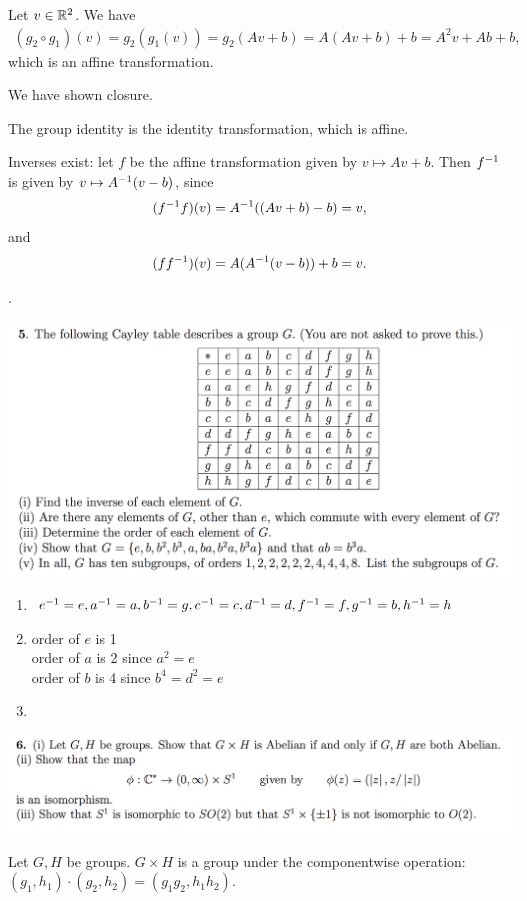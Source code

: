 \documentclass[12pt]{article}
\begin{document}
Let $v \in \mathbb{R}^2$. We have
\begin{align*}
  (g_2 \circ g_1)(v)
  = g_2(g_1(v))
  = g_2(Av + b)
  = A(Av + b) + b
  = A^2v + Ab + b,
\end{align*}
which is an affine transformation.

We have shown closure.

The group identity is the identity transformation, which is affine.

Inverses exist: let $f$ be the affine transformation given by $v \mapsto Av + b$. Then $f^{-1}$ is
given by $v \mapsto A^{-1}(v - b)$, since
\begin{align*}
(f^{-1}f)(v) = A^{-1}((Av + b) - b) = v,
\end{align*}
and
\begin{align*}
(ff^{-1})(v) = A(A^{-1}(v - b)) + b = v.
\end{align*}

.

\newpage
\begin{mdframed}
\includegraphics[width=400pt]{img/oxford-prelims-M1-groups-1-5.png}
\end{mdframed}
\begin{enumerate}[label=(\roman*)]
\item $e^{-1} = e, a^{-1} = a, b^{-1} = g, c^{-1} = c, d^{-1} = d, f^{-1} = f, g^{-1} = b, h^{-1} = h$
\item
  order of $e$ is 1\\
  order of $a$ is 2 since $a^2 = e$\\
  order of $b$ is 4 since $b^4 = d^2 = e$
\item
\end{enumerate}
\newpage
\begin{mdframed}
\includegraphics[width=400pt]{img/oxford-prelims-M1-groups-1-6.png}
\end{mdframed}
\begin{definition*}
  Let $G, H$ be groups. $G \times H$ is a group under the componentwise operation:
  $(g_1, h_1) \cdot (g_2, h_2) = (g_1g_2, h_1h_2)$.
\end{definition*}
\end{document}
